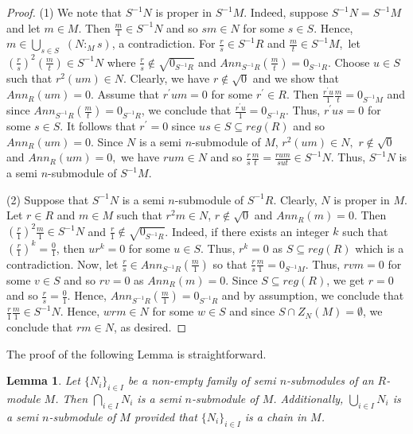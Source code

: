 \documentclass{amsart}%
\theoremstyle{plain}
\newtheorem{lemma}{Lemma}
\numberwithin{equation}{section}
\begin{document}
\begin{proof}
(1) We note that $S^{-1}N$ is proper in $S^{-1}M$. Indeed, suppose
$S^{-1}N=S^{-1}M$ and let $m\in M$. Then $\frac{m}{1}\in S^{-1}N$ and so
$sm\in N$ for some $s\in S$. Hence, $m\in%
{\displaystyle\bigcup\limits_{s\in S}}
$ $(N:_{M}s)$, a contradiction. For $\frac{r}{s}\in S^{-1}R$ and $\frac{m}%
{t}\in S^{-1}M$,\ let $\left(  \frac{r}{s}\right)  ^{2}\left(  \frac{m}%
{t}\right)  \in S^{-1}N$ where $\frac{r}{s}\notin\sqrt{0_{S^{-1}R}}$ and
$Ann_{S^{-1}R}(\frac{m}{t})=0_{S^{-1}R}$. Choose $u\in S$ such that
$r^{2}(um)\in N$. Clearly, we have $r\notin\sqrt{0}$ and we show that
$Ann_{R}(um)=0$. Assume that $r^{\prime}um=0$ for some $r^{\prime}\in R$. Then
$\frac{r^{\prime}u}{1}\frac{m}{t}=0_{S^{-1}M}$ and since $Ann_{S^{-1}R}%
(\frac{m}{t})=0_{S^{-1}R}$, we conclude that $\frac{r^{\prime}u}{1}%
=0_{S^{-1}R}$. Thus, $r^{\prime}us=0$ for some $s\in S$. It follows that
$r^{\prime}=0$ since $us\in S\subseteq reg(R)$ and so $Ann_{R}(um)=0$. Since
$N$ is a semi $n$-submodule of $M$, $r^{2}(um)\in N,$ $r\notin\sqrt{0}$ and
$Ann_{R}(um)=0,$ we have $rum\in N$ and so $\frac{r}{s}\frac{m}{t}=\frac
{rum}{sut}\in S^{-1}N$. Thus, $S^{-1}N$ is a semi $n$-submodule of $S^{-1}M.$

(2) Suppose that $S^{-1}N$ is a semi $n$-submodule of $S^{-1}R.$ Clearly, $N$
is proper in $M$. Let $r\in R$ and $m\in M$ such that $r^{2}m\in N$,
$r\notin\sqrt{0}$ and $Ann_{R}(m)=0$. Then $\left(  \frac{r}{1}\right)
^{2}\frac{m}{1}\in S^{-1}N$ and $\frac{r}{1}\notin\sqrt{0_{S^{-1}R}}$. Indeed,
if there exists an integer $k$ such that $\left(  \frac{r}{1}\right)
^{k}=\frac{0}{1}$, then $ur^{k}=0$ for some $u\in S$. Thus, $r^{k}=0$ as
$S\subseteq reg(R)$ which is a contradiction. Now, let $\frac{r}{s}\in
Ann_{S^{-1}R}(\frac{m}{1})$ so that $\frac{r}{s}\frac{m}{1}=0_{S^{-1}M}$.
Thus, $rvm=0$ for some $v\in S$ and so $rv=0$ as $Ann_{R}(m)=0$. Since
$S\subseteq reg(R)$, we get $r=0$ and so $\frac{r}{s}=\frac{0}{1}$. Hence,
$Ann_{S^{-1}R}(\frac{m}{1})=0_{S^{-1}R}$ and by assumption, we conclude that
$\frac{r}{1}\frac{m}{1}\in S^{-1}N$. Hence, $wrm\in N$ for some $w\in S$ and
since $S\cap Z_{N}(M)=\emptyset$, we conclude that $rm\in N$, as desired.
\end{proof}

The proof of the following Lemma is straightforward.

\begin{lemma}
\label{int}Let $\{N_{i}\}_{i\in I}$ be a non-empty family of semi
$n$-submodules of an $R$-module $M$. Then $%
{\displaystyle\bigcap\limits_{i\in I}}
N_{i}$ is a semi $n$-submodule of $M$. Additionally, $%
{\displaystyle\bigcup\limits_{i\in I}}
N_{i}$ is a semi $n$-submodule of $M$ provided that $\{N_{i}\}_{i\in I}$ is a
chain in $M$.
\end{lemma}
\end{document}
